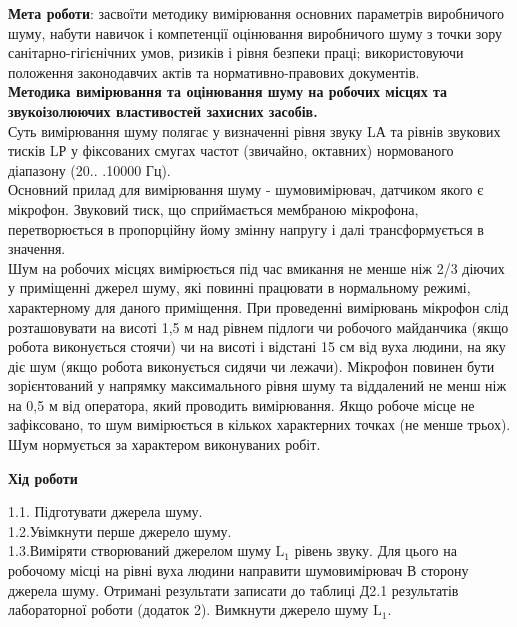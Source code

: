 \documentclass[a4paper,14pt]{extreport}
\begin{document}
\textbf{Мета роботи}: засвоїти методику вимірювання основних параметрів виробничого шуму, набути навичок і компетенції оцінювання виробничого шуму з точки зору санітарно-гігієнічних умов, ризиків і рівня безпеки праці; використовуючи положення законодавчих актів та нормативно-правових документів.\\


\textbf{Методика вимірювання та оцінювання шуму на робочих місцях та звукоізолюючих властивостей захисних засобів.}\\
Суть вимірювання шуму полягає у визначенні рівня звуку LА та рівнів звукових тисків LР у фіксованих смугах частот (звичайно, октавних) нормованого діапазону (20.. .10000 Гц).\\

Основний прилад для вимірювання шуму - шумовимірювач, датчиком якого є мікрофон. Звуковий тиск, що сприймається мембраною мікрофона, перетворюється в пропорційну йому змінну напругу і далі трансформується в значення.\\
Шум на робочих місцях вимірюється під час вмикання не менше ніж 2/3 діючих у приміщенні джерел шуму, які повинні працювати в нормальному режимі, характерному для даного приміщення. При проведенні вимірювань мікрофон слід розташовувати на висоті 1,5 м над рівнем підлоги чи робочого майданчика (якщо робота виконується стоячи) чи на висоті і відстані 15 см від вуха людини, на яку діє шум (якщо робота виконується сидячи чи лежачи). Мікрофон повинен бути зорієнтований у напрямку максимального рівня шуму та віддалений не менш ніж на 0,5 м від оператора, який проводить вимірювання. Якщо робоче місце не зафіксовано, то шум вимірюється в кількох характерних точках (не менше трьох).\\

Шум нормується за характером виконуваних робіт.

\begin{center}\textbf{Хід роботи}\end{center}
\par
1.1. Підготувати джерела шуму.\\

1.2.Увімкнути перше джерело шуму.\\

1.3.Виміряти створюваний джерелом шуму $\mathrm{L}_{1}$ рівень звуку. Для цього на робочому місці на рівні вуха людини направити шумовимірювач В сторону джерела шуму. Отримані результати записати до таблиці Д2.1 результатів лабораторної роботи (додаток 2). Вимкнути джерело шуму $\mathrm{L}_{1} .$\\
\end{document}
